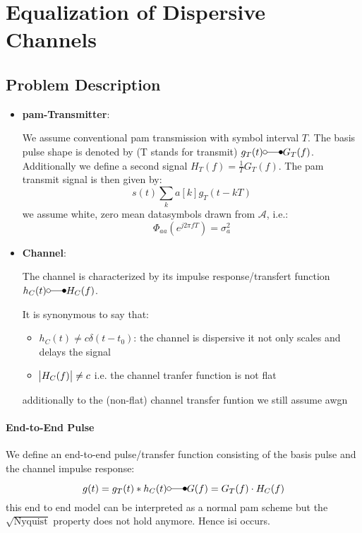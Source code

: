 \chapter{Equalization of Dispersive Channels}
\section{Problem Description}
\begin{itemize}
    \item \textbf{\ac{pam}-Transmitter}:

        We assume conventional \ac{pam} transmission with symbol interval $T$.
        The basis pulse shape is denoted by (T stands for transmit)
        $g_T(t) \laplace G_T(f)$. Additionally we define a second signal
        $H_T(f) = \frac{1}{T} G_T(f)$. The \ac{pam} transmit signal
        is then given by:
        \begin{equation}
            s(t) \sum_k a[k] g_T(t - kT)
        \end{equation}
        we assume white, zero mean datasymbols drawn from $\mathcal{A}$, i.e.:
        \begin{equation}
            \Phi_{aa}(e^{j 2 \pi f T}) = \sigma_a^2
        \end{equation}

    \item \textbf{Channel}:
        
        The channel is characterized by its impulse response/transfert function
        $h_C(t) \laplace H_C(f)$. 

        It is synonymous to say that:
        \begin{itemize}
            \item $h_C(t) \neq c \delta(t-t_0)$: the channel is dispersive it not only
                scales and delays the signal
            \item $\abs{H_C(f)} \neq c$ i.e. the channel tranfer function is not flat
        \end{itemize}
        additionally to the (non-flat) channel transfer funtion we still assume \ac{awgn}
\end{itemize}

\subsubsection{End-to-End Pulse}
We define an end-to-end pulse/transfer function consisting of the basis pulse and the
channel impulse response:
\begin{equation}
    g(t) = g_T(t) * h_C(t) \laplace G(f) = G_T(f) \cdot H_C(f)
\end{equation}
this end to end model can be interpreted as a normal \ac{pam} scheme but the $\sqrt{\text{
Nyquist}}$ property does not hold anymore. Hence \ac{isi} occurs.

